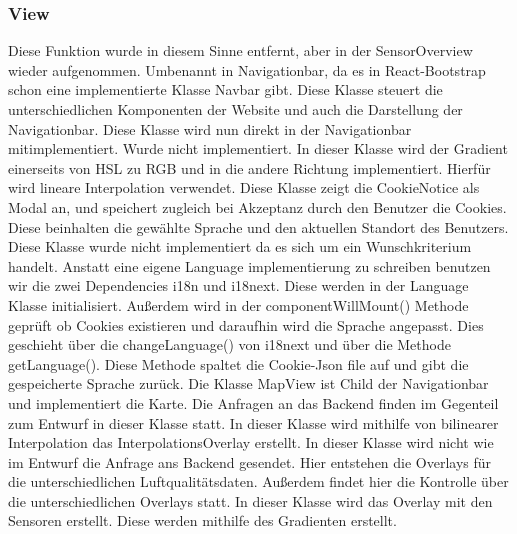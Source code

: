 \subsubsection{View}
    Diese Funktion wurde in diesem Sinne entfernt, aber in der SensorOverview wieder aufgenommen.
    Umbenannt in Navigationbar, da es in React-\gls{Bootstrap} schon eine implementierte Klasse Navbar gibt.
    Diese Klasse steuert die unterschiedlichen Komponenten der Website und auch die Darstellung der Navigationbar.
    \removedClass
    Diese Klasse wird nun direkt in der Navigationbar mitimplementiert.
    \removedClass
{}
    Wurde nicht implementiert. 
    In dieser Klasse wird der Gradient einerseits von HSL zu RGB und in die andere Richtung implementiert. Hierfür wird lineare Interpolation verwendet.
    Diese Klasse zeigt die \gls{Cookie}Notice als Modal an, und speichert zugleich bei Akzeptanz durch den Benutzer die \gls{Cookie}s.
    Diese beinhalten die gewählte Sprache und den aktuellen Standort des Benutzers.
    Diese Klasse wurde nicht implementiert da es sich um ein Wunschkriterium handelt.
    Anstatt eine eigene Language implementierung zu schreiben benutzen wir die zwei Dependencies i18n und i18next.
    Diese werden in der Language Klasse initialisiert. 
    Außerdem wird in der componentWillMount() Methode geprüft ob \gls{Cookie}s existieren und daraufhin wird die Sprache angepasst. Dies geschieht über die changeLanguage() von i18next und über die Methode getLanguage().
    Diese Methode spaltet die \gls{Cookie}-Json file auf und gibt die gespeicherte Sprache zurück.
    Die Klasse MapView ist Child der Navigationbar und implementiert die Karte. Die Anfragen an das Backend finden im Gegenteil zum Entwurf in dieser Klasse statt. 
    \removedClass
{}
    In dieser Klasse wird mithilfe von bilinearer Interpolation das InterpolationsOverlay erstellt.
    In dieser Klasse wird nicht wie im Entwurf die Anfrage ans Backend gesendet. Hier entstehen die Overlays für die unterschiedlichen Luftqualitätsdaten.
    Außerdem findet hier die Kontrolle über die unterschiedlichen Overlays statt.
    \removedClass
{}
    In dieser Klasse wird das Overlay mit den Sensoren erstellt. Diese werden mithilfe des Gradienten erstellt.
